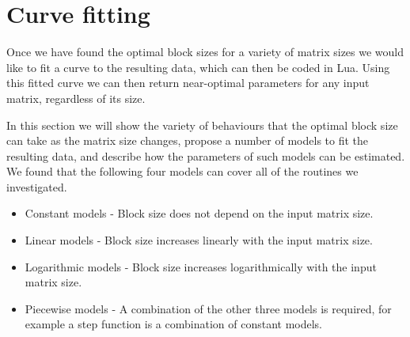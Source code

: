 \documentclass[a4paper,12pt]{article}
\begin{document}
\section{Curve fitting}
\label{sec.curvefitting}
Once we have found the optimal block sizes for a variety of matrix
sizes we would like to fit a curve to the resulting data,
which can then be coded in Lua.
Using this fitted curve we can then return near-optimal
parameters for any input matrix,
regardless of its size.

In this section we will show the variety of behaviours
that the optimal block size can take as the matrix size changes,
propose a number of models to fit the resulting data,
and describe how the parameters of such models can be estimated.
We found that the following four models can cover all
of the routines we investigated.

\begin{itemize}
\item Constant models - Block size does not depend on the input matrix size.
\item Linear models - Block size increases linearly with the input matrix size.
\item Logarithmic models - Block size increases logarithmically with the
  input matrix size.
\item Piecewise models - A combination of the other three models is required,
  for example a step function is a combination of constant models.
\end{itemize}
\end{document}

